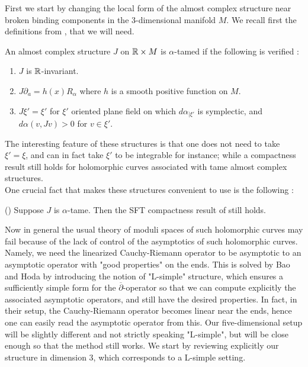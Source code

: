 \documentclass[../main.tex]{subfiles}
\begin{document}
First we start by changing the local form of the almost complex structure near broken binding components in the 3-dimensional manifold $M$. We recall first the definitions from \cite{bao_definition_2018},\cite{bao_semi-global_2023} that we will need.

\begin{definition}
An almost complex structure $J$ on $\mathbb{R}\times M$ is $\alpha$-tamed if the following is verified :
\begin{enumerate}
    \item $J$ is $\mathbb{R}$-invariant.
    \item $J\partial_a = h(x)R_\alpha$ where $h$ is a smooth positive function on $M$.
    \item $J\xi' = \xi'$ for $\xi'$ oriented plane field on which $d\alpha_{|\xi'}$ is symplectic, and $d\alpha(v,Jv) > 0$ for $v\in \xi'$.
\end{enumerate}
\end{definition}

The interesting feature of these structures is that one does not need to take $\xi' = \xi$, and can in fact take $\xi'$ to be integrable for instance; while a compactness result still holds for holomorphic curves associated with tame almost complex structures. \\
One crucial fact that makes these structures convenient to use is the following :

\begin{theorem}(\cite{bao_definition_2018})
\newline
Suppose $J$ is $\alpha$-tame. Then the SFT compactness result of \cite{bourgeois_compactness_2003} still holds. 
\end{theorem}

Now in general the usual theory of moduli spaces of such holomorphic curves may fail because of the lack of control of the asymptotics of such holomorphic curves. Namely, we need the linearized Cauchy-Riemann operator to be asymptotic to an asymptotic operator with "good properties" on the ends. This is solved by Bao and Hoda by introducing the notion of "L-simple" structure, which ensures a sufficiently simple form for the $\overline{\partial}$-operator so that we can compute explicitly the associated asymptotic operators, and still have the desired properties. In fact, in their setup, the Cauchy-Riemann operator becomes linear near the ends, hence one can easily read the asymptotic operator from this. Our five-dimensional setup will be slightly different and not strictly speaking "L-simple", but will be close enough so that the method still works. We start by reviewing explicitly our structure in dimension $3$, which corresponds to a L-simple setting.
\end{document}
